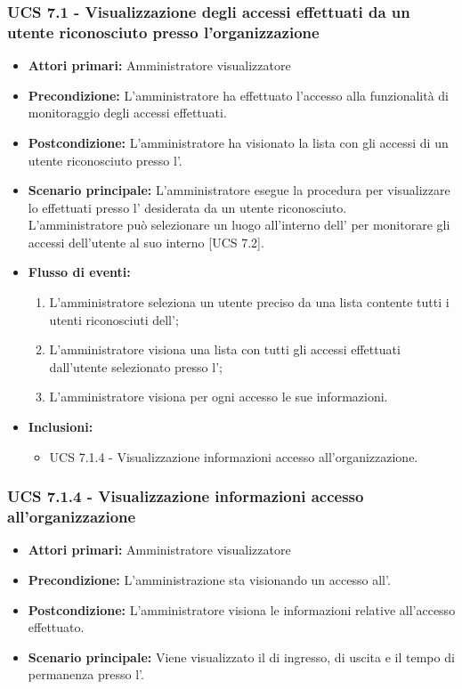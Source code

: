 \subsubsection{UCS 7.1 - Visualizzazione degli accessi effettuati da un utente riconosciuto presso l'organizzazione}
\begin{itemize}
	\item \textbf{Attori primari:} Amministratore visualizzatore
	\item \textbf{Precondizione:} L'amministratore ha effettuato l'accesso alla funzionalità di monitoraggio degli accessi effettuati.
	\item \textbf{Postcondizione:} L'amministratore ha visionato la lista con gli accessi di un utente riconosciuto presso l'.
	\item \textbf{Scenario principale:} L'amministratore esegue la procedura per visualizzare lo  effettuati presso l' desiderata da un utente riconosciuto.\\
	L'amministratore può selezionare un luogo all'interno dell' per monitorare gli accessi dell'utente al suo interno [UCS 7.2].
	\item \textbf{Flusso di eventi:}
	\begin{enumerate}
		\item L'amministratore seleziona un utente preciso da una lista contente tutti i utenti riconosciuti dell';
		\item L'amministratore visiona una lista con tutti gli accessi effettuati dall'utente selezionato presso l';
		\item L'amministratore visiona per ogni accesso le sue informazioni.
	\end{enumerate}
	\item \textbf{Inclusioni:}
    \begin{itemize}
        \item UCS 7.1.4 - Visualizzazione informazioni accesso all'organizzazione.
    \end{itemize}
\end{itemize}

\subsubsection{UCS 7.1.4 - Visualizzazione informazioni accesso all'organizzazione}
\begin{itemize}
	\item \textbf{Attori primari:} Amministratore visualizzatore
	\item \textbf{Precondizione:} L'amministrazione sta visionando un accesso all'.
	\item \textbf{Postcondizione:} L'amministratore visiona le informazioni relative all'accesso effettuato.
	\item \textbf{Scenario principale:} Viene visualizzato il  di ingresso, di uscita e il tempo di permanenza presso l'.
\end{itemize}

